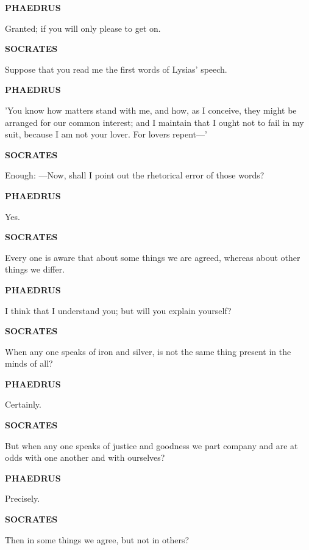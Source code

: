 \documentclass[11pt,letter]{article}
\begin{document}
\par \textbf{PHAEDRUS}
\par   Granted; if you will only please to get on.

\par \textbf{SOCRATES}
\par   Suppose that you read me the first words of Lysias' speech.

\par \textbf{PHAEDRUS}
\par   'You know how matters stand with me, and how, as I conceive, they might be arranged for our common interest; and I maintain that I ought not to fail in my suit, because I am not your lover. For lovers repent—'

\par \textbf{SOCRATES}
\par   Enough: —Now, shall I point out the rhetorical error of those words?

\par \textbf{PHAEDRUS}
\par   Yes.

\par \textbf{SOCRATES}
\par   Every one is aware that about some things we are agreed, whereas about other things we differ.

\par \textbf{PHAEDRUS}
\par   I think that I understand you; but will you explain yourself?

\par \textbf{SOCRATES}
\par   When any one speaks of iron and silver, is not the same thing present in the minds of all?

\par \textbf{PHAEDRUS}
\par   Certainly.

\par \textbf{SOCRATES}
\par   But when any one speaks of justice and goodness we part company and are at odds with one another and with ourselves?

\par \textbf{PHAEDRUS}
\par   Precisely.

\par \textbf{SOCRATES}
\par   Then in some things we agree, but not in others?
\end{document}
